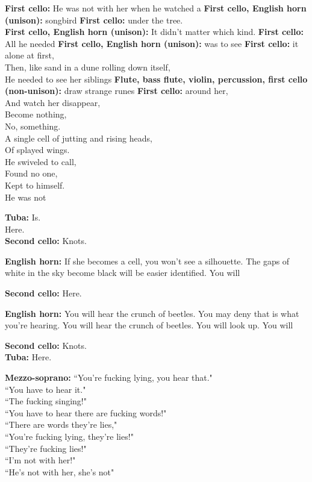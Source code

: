\documentclass[11pt]{article}
\begin{document}
\begingroup
\textbf{First cello:} He was not with her when he watched a \textbf{First cello, English horn (unison):} songbird \textbf{First cello:} under the tree. \\ \textbf{First cello, English horn (unison):} It didn't matter which kind. \textbf{First cello:} All he needed \textbf{First cello, English horn (unison):} was to see \textbf{First cello:} it alone at first, \\ Then, like sand in a dune rolling down itself, \\ He needed to see her siblings  \textbf{Flute, bass flute, violin, percussion, first cello (non-unison):} draw strange runes \textbf{First cello:} around her, \\ And watch her disappear, \\ Become nothing, \\ No, something. \\  A single cell of jutting and rising heads, \\ Of splayed wings. \\ He swiveled to call, \\ Found no one, \\ Kept to himself. \\ He was not
\endgroup

\begingroup
\textbf{Tuba:} Is. \\ Here. \\ \textbf{Second cello:} Knots.
\endgroup

\begingroup
\textbf{English horn:} If she becomes a cell, you won't see a silhouette. The gaps of white in the sky become black will be easier identified. You will 
\endgroup

\begingroup
\textbf{Second cello:} Here.
\endgroup

\begingroup
\textbf{English horn:} You will hear the crunch of beetles. You may deny that is what you're hearing. You will hear the crunch of beetles. You will look up. You will
\endgroup

\begingroup
\textbf{Second cello:} Knots. \\ \textbf{Tuba:} Here.
\endgroup

\begingroup
\textbf{Mezzo-soprano:} ``You're fucking lying, you hear that." \\ ``You have to hear it." \\ ``The fucking singing!" \\ ``You have to hear there are fucking words!" \\ ``There are words they're lies," \\ ``You're fucking lying, they're lies!" \\ ``They're fucking lies!" \\ ``I'm not with her!" \\ ``He's not with her, she's not"
\endgroup
\end{document}
